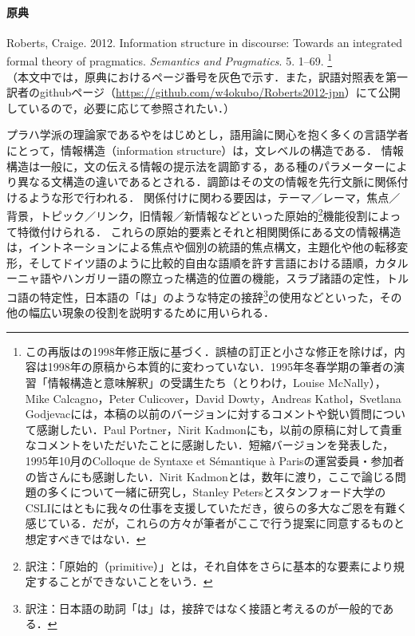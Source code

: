 \documentclass{goken}
\newcommand{\term}[2]{\textsf{#1}（#2）}
\newcommand{\ori}[1]{\noindent\textcolor[gray]{0.7}{\fontsize{8pt}{8pt}\selectfont{\textsf{(p.~#1)}}} }
\begin{document}
\paragraph*{原典}
Roberts, Craige. 2012. Information structure in discourse: Towards an integrated formal theory of pragmatics. \emph{Semantics and Pragmatics}. 5. 1--69. 
\footnote{%
この再版は\citet{Roberts1996b}の1998年修正版に基づく．誤植の訂正と小さな修正を除けば，内容は1998年の原稿から本質的に変わっていない．1995年冬春学期の筆者の演習「情報構造と意味解釈」の受講生たち（とりわけ，Louise McNally），Mike Calcagno，Peter Culicover，David Dowty，Andreas Kathol，Svetlana Godjevacには，本稿の以前のバージョンに対するコメントや鋭い質問について感謝したい．Paul Portner，Nirit Kadmonにも，以前の原稿に対して貴重なコメントをいただいたことに感謝したい．短縮バージョンを発表した，1995年10月のColloque de Syntaxe et S\'{e}mantique \`{a} Parisの運営委員・参加者の皆さんにも感謝したい．Nirit Kadmonとは，数年に渡り，ここで論じる問題の多くについて一緒に研究し，Stanley Petersとスタンフォード大学のCSLIにはともに我々の仕事を支援していただき，彼らの多大なご恩を有難く感じている．だが，これらの方々が筆者がここで行う提案に同意するものと想定すべきではない．}
\\
（本文中では，原典におけるページ番号を\textcolor[gray]{0.7}{\textsf{灰色}}で示す．また，訳語対照表を第一訳者のgithubページ（\url{https://github.com/w4okubo/Roberts2012-jpn}）にて公開しているので，必要に応じて参照されたい．）

\bigskip

\ori{2}プラハ学派の理論家である\citet{Halliday1967}や\citet{Vallduvi1993}をはじめとし，語用論に関心を抱く多くの言語学者にとって，\term{情報構造}{information structure}は，文レベルの構造である．
情報構造は一般に，文の伝える情報の提示法を調節する，ある種のパラメーターにより異なる文構造の違いであるとされる．調節はその文の情報を先行文脈に関係付けるような形で行われる．
\renewcommand{\thefootnote}{\fnsymbol{footnote}}
\setcounter{footnote}{0}
関係付けに関わる要因は，テーマ／レーマ，焦点／背景，トピック／リンク，旧情報／新情報などといった原始的\footnote{訳注：「原始的（primitive）」とは，それ自体をさらに基本的な要素により規定することができないことをいう．}機能役割によって特徴付けられる．
これらの原始的要素とそれと相関関係にある文の情報構造は，イントネーションによる焦点や個別の統語的焦点構文，主題化や他の転移変形，そしてドイツ語のように比較的自由な語順を許す言語における語順，カタルーニャ語やハンガリー語の際立った構造的位置の機能，スラブ諸語の定性，トルコ語の特定性，日本語の「は」のような特定の接辞\footnote{訳注：日本語の助詞「は」は，接辞ではなく接語と考えるのが一般的である．}の使用などといった，その他の幅広い現象の役割を説明するために用いられる．
\end{document}
